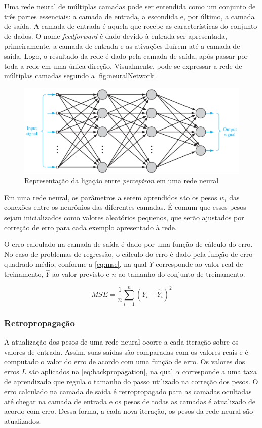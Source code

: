\documentclass[
    12pt,
    oneside,
    a4paper,
    english,
    brazil
]{abntex2}
\begin{document}
Uma  rede  neural   de  múltiplas  camadas pode ser entendida como um conjunto de
três  partes essenciais: a camada de entrada, a escondida  e, por último, a camada 
de saída. A  camada de  entrada é  aquela que  recebe as  características do  conjunto de dados. O nome \textit{feedforward} é dado devido à entrada ser apresentada,
primeiramente, a camada de  entrada e as ativações fluírem até  a camada de saída. 
Logo, o resultado da  rede é dado pela camada de saída,  após passar por  toda a
rede em  uma única  direção. Visualmente,  pode-se expressar  a rede de múltiplas camadas segundo a
\autoref{fig:neuralNetwork}.

\begin{figure}[ht]
    \centering
    \caption{Representação da ligação entre \textit{perceptron} em uma rede
    neural}\label{fig:neuralNetwork}
    \includegraphics[width=.5\linewidth]{images/neuralNetwork.png}
\end{figure}

Em uma rede neural, os parâmetros a  serem aprendidos são os pesos $w_i$ das conexões entre os neurônios das diferentes camadas. É comum que esses pesos sejam inicializados como valores aleatórios pequenos, que serão ajustados por correção de erro para cada exemplo apresentado à rede.

O erro calculado na camada de saída é dado por uma função de cálculo do erro.
No caso de problemas de regressão, o cálculo do erro é dado pela função de erro quadrado  médio, conforme a \autoref{eq:mse}, na qual $Y$ corresponde ao valor real de treinamento, $\hat{Y}$ ao valor previsto e $n$ ao tamanho do conjunto
de treinamento.

\begin{equation}\label{eq:mse}
    MSE = \frac{1}{n}\sum_{i=1}^{n}{{(Y_i - \hat{Y}_i)}^2}
\end{equation}

\subsubsection{Retropropagação}

A atualização  dos pesos de uma rede neural ocorre  a cada iteração  sobre os valores
de entrada. Assim,  suas  saídas  são  comparadas  com  os  valores  reais  e é computado  o
valor do erro de acordo com uma função de erro. Os  valores  dos erros  $L$ são aplicados na \autoref{eq:backpropagation}, na qual $\alpha$ corresponde a uma taxa de aprendizado que regula o tamanho do passo utilizado na correção dos pesos. O erro calculado na camada de saída é retropropagado para as camadas ocultadas até chegar na camada de entrada e os pesos de todas as camadas é atualizado de acordo com erro. Dessa forma, a cada nova iteração, os pesos  da rede neural são atualizados.
\end{document}
